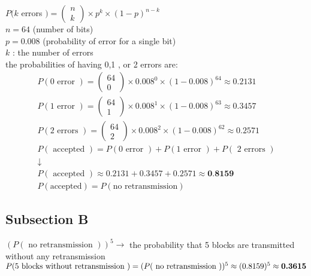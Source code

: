 \documentclass[a4paper,11pt]{article}
\theoremstyle{mytheor}
\begin{document}
$P(k$ errors $)=\left(\begin{array}{l}n \\ k\end{array}\right) \times p^k \times(1-p)^{n-k}$\\
$n=64$ (number of bits)\\
$p=0.008$ (probability of error for a single bit)\\
$k$ : the number of errors\\
the probabilities of having 0,1 , or 2 errors are:
$$
\begin{gathered}
P(0 \text { error })=\left(\begin{array}{c}
64 \\
0
\end{array}\right) \times 0.008^0 \times(1-0.008)^{64} \approx 0.2131 \\
P(1 \text { error })=\left(\begin{array}{c}
64 \\
1
\end{array}\right) \times 0.008^1 \times(1-0.008)^{63} \approx 0.3457 \\
P(2 \text { errors })=\left(\begin{array}{c}
64 \\
2
\end{array}\right) \times 0.008^2 \times(1-0.008)^{62} \approx 0.2571 \\
P(\text { accepted })=P(0 \text { error })+P(1 \text { error })+P(\text { 2 errors }) \\
\downarrow \\
P(\text { accepted }) \approx 0.2131+0.3457+0.2571 \approx \textbf{0.8159}\\
P(\text{accepted}) = P(\text{no retransmission})
\end{gathered}
$$

\subsection{Subsection B}

$(P(\text { no retransmission }))^5 \rightarrow$ the probability that
5 blocks are transmitted without any retransmission
$
\\
P(5 \text { blocks without retransmission })=(P(\text { no retransmission }))^5 \approx(0.8159)^5 \approx \textbf{0.3615}
$
\newpage
\end{document}
